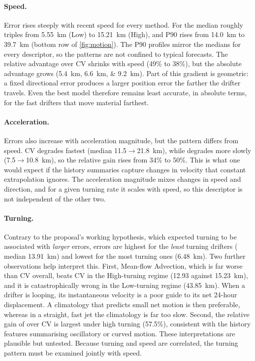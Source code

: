 \paragraph{Speed.} Error rises steeply with recent speed for every method. For \GBH{} the median roughly triples from \SI{5.55}{km} (Low) to \SI{15.21}{km} (High), and P90 rises from \SI{14.0}{km} to \SI{39.7}{km} (bottom row of \cref{fig:motion}). The P90 profiles mirror the medians for every descriptor, so the patterns are not confined to typical forecasts. The relative advantage over CV shrinks with speed (49\% to 38\%), but the absolute advantage grows (\SIlist{5.4;6.6;9.2}{km}). Part of this gradient is geometric: a fixed directional error produces a larger position error the farther the drifter travels. Even the best model therefore remains least accurate, in absolute terms, for the fast drifters that move material farthest.

\paragraph{Acceleration.} Errors also increase with acceleration magnitude, but the pattern differs from speed. CV degrades fastest (median \SI{11.5}{}$\to$\SI{21.8}{km}), while \GBH{} degrades more slowly (\SI{7.5}{}$\to$\SI{10.8}{km}), so the relative gain rises from 34\% to 50\%. This is what one would expect if the history summaries capture changes in velocity that constant extrapolation ignores. The acceleration magnitude mixes changes in speed and direction, and for a given turning rate it scales with speed, so this descriptor is not independent of the other two.

\paragraph{Turning.} Contrary to the proposal's working hypothesis, which expected turning to be associated with \emph{larger} errors, errors are highest for the \emph{least} turning drifters (\GBH{} median \SI{13.91}{km}) and lowest for the most turning ones (\SI{6.48}{km}). Two further observations help interpret this. First, Mean-flow Advection, which is far worse than CV overall, beats CV in the High-turning regime (\SI{12.93}{} against \SI{15.23}{km}), and it is catastrophically wrong in the Low-turning regime (\SI{43.85}{km}). When a drifter is looping, its instantaneous velocity is a poor guide to its net 24-hour displacement. A climatology that predicts small net motion is then preferable, whereas in a straight, fast jet the climatology is far too slow. Second, the relative gain of \GBH{} over CV is largest under high turning (57.5\%), consistent with the history features summarising oscillatory or curved motion. These interpretations are plausible but untested. Because turning and speed are correlated, the turning pattern must be examined jointly with speed.

